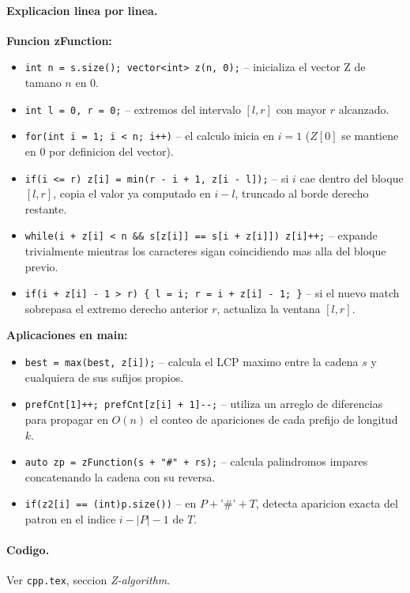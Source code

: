 \paragraph{Explicacion linea por linea.}
\textbf{Funcion zFunction:}
\begin{itemize}\setlength\itemsep{0pt}
	\item \verb|int n = s.size(); vector<int> z(n, 0);| -- inicializa el vector Z de tamano $n$ en 0.
	\item \verb|int l = 0, r = 0;| -- extremos del intervalo $[l, r]$ con mayor $r$ alcanzado.
	\item \verb|for(int i = 1; i < n; i++)| -- el calculo inicia en $i = 1$ ($Z[0]$ se mantiene en 0 por definicion del vector).
	\item \verb|if(i <= r) z[i] = min(r - i + 1, z[i - l]);| -- si $i$ cae dentro del bloque $[l, r]$, copia el valor ya computado en $i - l$, truncado al borde derecho restante.
	\item \verb|while(i + z[i] < n && s[z[i]] == s[i + z[i]]) z[i]++;| -- expande trivialmente mientras los caracteres sigan coincidiendo mas alla del bloque previo.
	\item \verb|if(i + z[i] - 1 > r) { l = i; r = i + z[i] - 1; }| -- si el nuevo match sobrepasa el extremo derecho anterior $r$, actualiza la ventana $[l, r]$.
\end{itemize}
\textbf{Aplicaciones en main:}
\begin{itemize}\setlength\itemsep{0pt}
	\item \verb|best = max(best, z[i]);| -- calcula el LCP maximo entre la cadena $s$ y cualquiera de sus sufijos propios.
	\item \verb|prefCnt[1]++; prefCnt[z[i] + 1]--;| -- utiliza un arreglo de diferencias para propagar en $O(n)$ el conteo de apariciones de cada prefijo de longitud $k$.
	\item \verb|auto zp = zFunction(s + "#" + rs);| -- calcula palindromos impares concatenando la cadena con su reversa.
	\item \verb|if(z2[i] == (int)p.size())| -- en $P + \text{'\#'} + T$, detecta aparicion exacta del patron en el indice $i - |P| - 1$ de $T$.
\end{itemize}

\paragraph{Codigo.}
Ver \texttt{cpp.tex}, seccion \textit{Z-algorithm}.

\vspace{0.5em}
